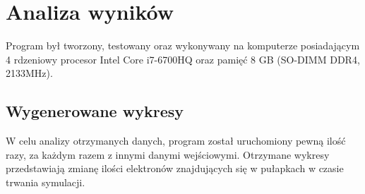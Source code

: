 \chapter{Analiza wyników}

Program był tworzony, testowany oraz wykonywany na komputerze posiadającym 4 rdzeniowy procesor Intel Core i7-6700HQ oraz pamięć 8 GB (SO-DIMM DDR4, 2133MHz).


\section{Wygenerowane wykresy}
\label{wynik:wykres}
W celu analizy otrzymanych danych, program został uruchomiony pewną ilość razy, za każdym razem z innymi danymi wejściowymi. Otrzymane wykresy przedstawiają zmianę ilości elektronów znajdujących się w pułapkach w czasie trwania symulacji.

